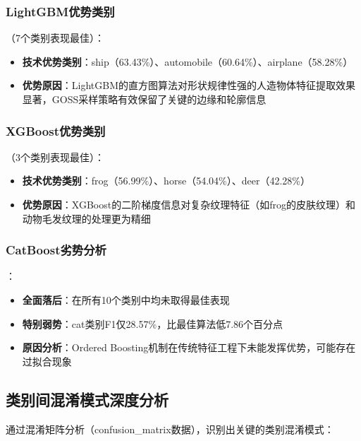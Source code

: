 \documentclass[UTF8]{report}
\theoremstyle{MyLineTheoremStyle} %
\theoremstyle{MyBlockTheoremStyle} %
\theoremstyle{MySubsubsectionStyle} %
\begin{document}
\subsubsection{LightGBM优势类别}（7个类别表现最佳）：
\begin{itemize}
    \item \textbf{技术优势类别}：ship（63.43\%）、automobile（60.64\%）、airplane（58.28\%）
    \item \textbf{优势原因}：LightGBM的直方图算法对形状规律性强的人造物体特征提取效果显著，GOSS采样策略有效保留了关键的边缘和轮廓信息
\end{itemize}
\subsubsection{XGBoost优势类别}（3个类别表现最佳）：
\begin{itemize}
    \item \textbf{技术优势类别}：frog（56.99\%）、horse（54.04\%）、deer（42.28\%）
    \item \textbf{优势原因}：XGBoost的二阶梯度信息对复杂纹理特征（如frog的皮肤纹理）和动物毛发纹理的处理更为精细
\end{itemize}
\subsubsection{CatBoost劣势分析}：
\begin{itemize}
    \item \textbf{全面落后}：在所有10个类别中均未取得最佳表现
    \item \textbf{特别弱势}：cat类别F1仅28.57\%，比最佳算法低7.86个百分点
    \item \textbf{原因分析}：Ordered Boosting机制在传统特征工程下未能发挥优势，可能存在过拟合现象
\end{itemize}

\subsection{类别间混淆模式深度分析}
通过混淆矩阵分析（confusion\_matrix数据），识别出关键的类别混淆模式：
\end{document}
